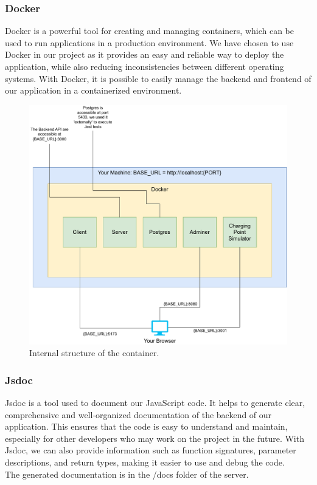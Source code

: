 \subsubsection{Docker}
Docker is a powerful tool for creating and managing containers, which can be used to run applications in a production environment. We have chosen to use Docker in our project as it provides an easy and reliable way to deploy the application, while also reducing inconsistencies between different operating systems. With Docker, it is possible to easily manage the backend and frontend of our application in a containerized environment.
\begin{figure}[H]
    \centering
    \hspace*{-2cm}
    \includegraphics[scale=0.60]{src/docker_structure/docker_structure.pdf}
    \caption{Internal structure of the container.}
\end{figure}

\subsubsection{Jsdoc}
Jsdoc is a tool used to document our JavaScript code. It helps to generate clear, comprehensive and well-organized documentation of the backend of our application. This ensures that the code is easy to understand and maintain, especially for other developers who may work on the project in the future. With Jsdoc, we can also provide information such as function signatures, parameter descriptions, and return types, making it easier to use and debug the code.
\hfill \\ The generated documentation is in the /docs folder of the server.
